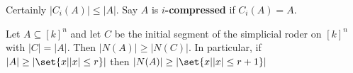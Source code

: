 \documentclass{article}
\begin{document}
Certainly $|C_i(A)| \leq |A|$.
Say $A$ is \textbf{$i$-compressed} if $C_i(A) = A$.
\begin{nthm}
  Let $A \subseteq [k]^n$ and let $C$ be the initial segment of the simplicial roder on $[k]^n$ with $|C| = |A|$.
  Then $|N(A)| \geq |N(C)|$. In particular, if $|A| \geq |\set{x | |x|\leq r}|$ then $|N(A)| \geq |\set{x | |x| \leq r+1}|$
\end{nthm}
\end{document}
